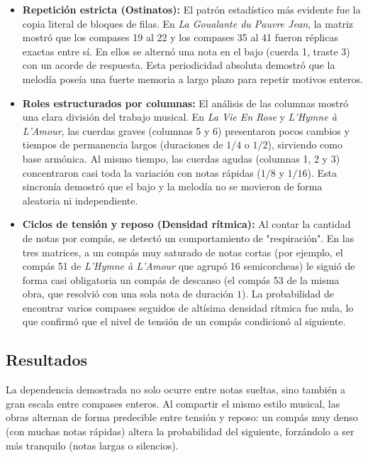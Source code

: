 \documentclass{article}
\theoremstyle{plain}
\theoremstyle{definition}
\begin{document}
\begin{itemize}
    \item \textbf{Repetición estricta (Ostinatos):} 
    El patrón estadístico más evidente fue la copia literal de bloques de filas. En \textit{La Goualante du Pauvre Jean}, la matriz mostró que los compases 19 al 22 y los compases 35 al 41 fueron réplicas exactas entre sí. En ellos se alternó una nota en el bajo (cuerda 1, traste 3) con un acorde de respuesta. Esta periodicidad absoluta demostró que la melodía poseía una fuerte memoria a largo plazo para repetir motivos enteros.

    \item \textbf{Roles estructurados por columnas:} 
    El análisis de las columnas mostró una clara división del trabajo musical. En \textit{La Vie En Rose} y \textit{L'Hymne à L'Amour}, las cuerdas graves (columnas 5 y 6) presentaron pocos cambios y tiempos de permanencia largos (duraciones de $1/4$ o $1/2$), sirviendo como base armónica. Al mismo tiempo, las cuerdas agudas (columnas 1, 2 y 3) concentraron casi toda la variación con notas rápidas ($1/8$ y $1/16$). Esta sincronía demostró que el bajo y la melodía no se movieron de forma aleatoria ni independiente.

    \item \textbf{Ciclos de tensión y reposo (Densidad rítmica):} 
    Al contar la cantidad de notas por compás, se detectó un comportamiento de "respiración". En las tres matrices, a un compás muy saturado de notas cortas (por ejemplo, el compás 51 de \textit{L'Hymne à L'Amour} que agrupó 16 semicorcheas) le siguió de forma casi obligatoria un compás de descanso (el compás 53 de la misma obra, que resolvió con una sola nota de duración $1$). La probabilidad de encontrar varios compases seguidos de altísima densidad rítmica fue nula, lo que confirmó que el nivel de tensión de un compás condicionó al siguiente.
\end{itemize}

\subsection*{Resultados}

La dependencia demostrada no solo ocurre entre notas sueltas, sino también a gran escala entre compases enteros. Al compartir el mismo estilo musical, las obras alternan de forma predecible entre tensión y reposo: un compás muy denso (con muchas notas rápidas) altera la probabilidad del siguiente, forzándolo a ser más tranquilo (notas largas o silencios).
\end{document}
